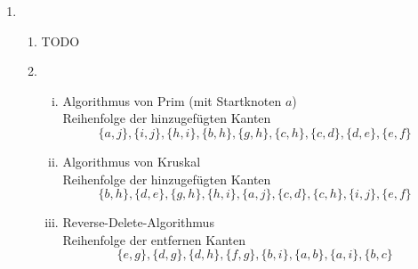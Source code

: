 \documentclass[a4paper]{scrartcl}
\begin{document}
\begin{enumerate}[label=\bfseries\arabic*.]
    \item
        \begin{enumerate}
            \item
                TODO

            \item
                \begin{enumerate}[(i)]
                    \item Algorithmus von Prim (mit Startknoten $a$) \\
                        Reihenfolge der hinzugefügten Kanten
                        \begin{equation}
                            \{ a, j \},
                            \{ i, j \},
                            \{ h, i \},
                            \{ b, h \},
                            \{ g, h \},
                            \{ c, h \},
                            \{ c, d \},
                            \{ d, e \},
                            \{ e, f \}
                        \end{equation}

                    \item Algorithmus von Kruskal \\
                        Reihenfolge der hinzugefügten Kanten
                        \begin{equation}
                            \{ b, h \},
                            \{ d, e \},
                            \{ g, h \},
                            \{ h, i \},
                            \{ a, j \},
                            \{ c, d \},
                            \{ c, h \},
                            \{ i, j \},
                            \{ e, f \}
                        \end{equation}

                    \item Reverse-Delete-Algorithmus \\
                        Reihenfolge der entfernen Kanten
                        \begin{equation}
                            \{ e, g \},
                            \{ d, g \},
                            \{ d, h \},
                            \{ f, g \},
                            \{ b, i \},
                            \{ a, b \},
                            \{ a, i \},
                            \{ b, c \}
                        \end{equation}


\end{enumerate}
\end{enumerate}
\end{enumerate}
\end{document}
